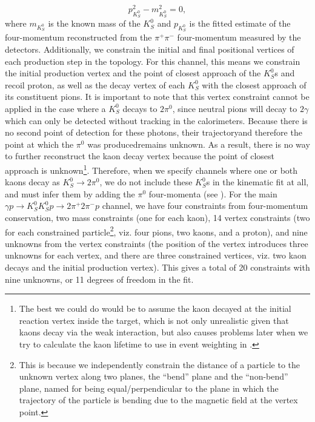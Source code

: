 \begin{equation}
  p_{K_S^0}^2 - m_{K_S^0}^2 = 0,
\end{equation}
where $m_{K_S^0}$ is the known mass of the $K_S^0$ and $p_{K_S^0}$ is the fitted estimate of the four-momentum reconstructed from the $\pi^+\pi^-$ four-momentum measured by the detectors. Additionally, we constrain the initial and final positional vertices of each production step in the topology. For this channel, this means we constrain the initial production vertex and the point of closest approach of the $K_S^0$s and recoil proton, as well as the decay vertex of each $K_S^0$ with the closest approach of its constituent pions. It is important to note that this vertex constraint cannot be applied in the case where a $K_S^0$ decays to $2\pi^0$, since neutral pions will decay to $2\gamma$ which can only be detected without tracking in the calorimeters. Because there is no second point of detection for these photons, their trajectory\textemdash and therefore the point at which the $\pi^0$ was produced\textemdash remains unknown. As a result, there is no way to further reconstruct the kaon decay vertex because the point of closest approach is unknown\footnote{The best we could do would be to assume the kaon decayed at the initial reaction vertex inside the target, which is not only unrealistic given that kaons decay via the weak interaction, but also causes problems later when we try to calculate the kaon lifetime to use in event weighting in .}. Therefore, when we specify channels where one or both kaons decay as $K_S^0\to 2\pi^0$, we do not include these $K_S^0$s in the kinematic fit at all, and must infer them by adding the $\pi^0$ four-momenta (see ). For the main $\gamma p \to K_S^0K_S^0p \to 2\pi^+2\pi^-p$ channel, we have four constraints from four-momentum conservation, two mass constraints (one for each kaon), 14 vertex constraints (two for each constrained particle\footnote{This is because we independently constrain the distance of a particle to the unknown vertex along two planes, the ``bend'' plane and the ``non-bend'' plane, named for being equal/perpendicular to the plane in which the trajectory of the particle is bending due to the magnetic field at the vertex point.}, viz. four pions, two kaons, and a proton), and nine unknowns from the vertex constraints (the position of the vertex introduces three unknowns for each vertex, and there are three constrained vertices, viz. two kaon decays and the initial production vertex). This gives a total of 20 constraints with nine unknowns, or 11 degrees of freedom in the fit.

